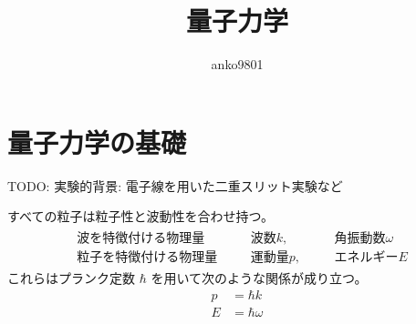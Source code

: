 \documentclass[uplatex,dvipdfmx,a4paper,11pt]{jlreq}
\title{量子力学}
\author{anko9801}
\numberwithin{equation}{section}
\theoremstyle{definition}
\begin{document}
\maketitle
\tableofcontents
\clearpage

\section{量子力学の基礎}
TODO: 実験的背景: 電子線を用いた二重スリット実験など
\begin{axiom}
  すべての粒子は粒子性と波動性を合わせ持つ。
  \begin{align}
    \begin{alignedat}{3}
      &波を特徴付ける物理量 \qquad &&波数 k,\qquad &&角振動数 \omega \\
      &粒子を特徴付ける物理量&& 運動量 p,&& エネルギー E
    \end{alignedat}
  \end{align}
  これらはプランク定数 $\hbar$ を用いて次のような関係が成り立つ。
  \begin{align}
    p & = \hbar k     \\
    E & = \hbar\omega
  \end{align}
\end{axiom}
\end{document}
